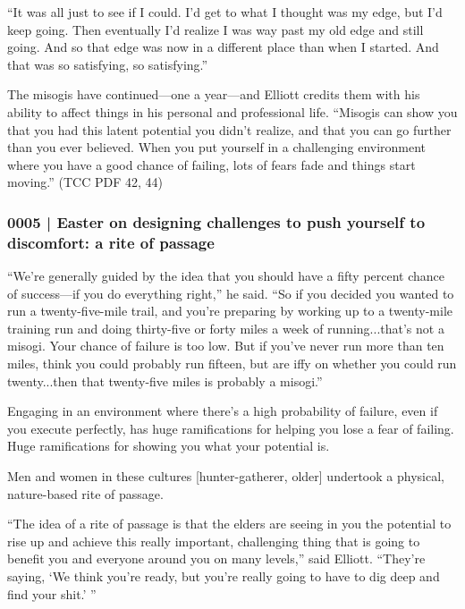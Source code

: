 			``It was all just to see if I could. I'd get to what I thought was my edge, but I'd keep going. Then eventually I'd realize I was way past my old edge and still going. And so that edge was now in a different place than when I started. And that was so satisfying, so satisfying.'' 

			The misogis have continued---one a year---and Elliott credits them with his ability to affect things in his personal and professional life. ``Misogis can show you that you had this latent potential you didn't realize, and that you can go further than you ever believed. When you put yourself in a challenging environment where you have a good chance of failing, lots of fears fade and things start moving.'' (TCC PDF 42, 44)
			
		\subsubsection{0005 | Easter on designing challenges to push yourself to discomfort: a rite of passage}
			\label{GM-LIFE-GROWTH-0005}
			
			``We're generally guided by the idea that you should have a fifty percent chance of success---if you do everything right,'' he said. ``So if you decided you wanted to run a twenty-five-mile trail, and you're preparing by working up to a twenty-mile training run and doing thirty-five or forty miles a week of running...that's not a misogi. Your chance of failure is too low. But if you've never run more than ten miles, think you could probably run fifteen, but are iffy on whether you could run twenty...then that twenty-five miles is probably a misogi.''

			Engaging in an environment where there's a high probability of failure, even if you execute perfectly, has huge ramifications for helping you lose a fear of failing. Huge ramifications for showing you what your potential is.

			Men and women in these cultures [hunter-gatherer, older] undertook a physical, nature-based rite of passage.
			
			``The idea of a rite of passage is that the elders are seeing in you the potential to rise up and achieve this really important, challenging thing that is going to benefit you and everyone around you on many levels,'' said Elliott. ``They're saying, `We think you're ready, but you're really going to have to dig deep and find your shit.' ''

